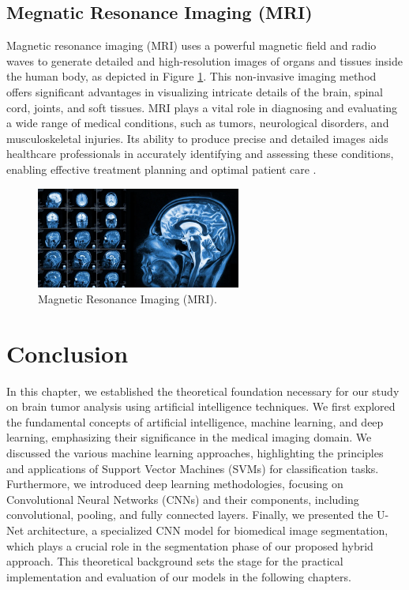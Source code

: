 \subsection{Megnatic Resonance Imaging (MRI)}
\label{sec:mri}
Magnetic resonance imaging (MRI) uses a powerful magnetic field and radio waves to
generate detailed and high-resolution images of organs and tissues inside the human body, as
depicted in Figure \ref{fig:mri}. This non-invasive imaging method offers significant advantages in
visualizing intricate details of the brain, spinal cord, joints, and soft tissues. MRI plays a vital
role in diagnosing and evaluating a wide range of medical conditions, such as tumors,
neurological disorders, and musculoskeletal injuries. Its ability to produce precise and detailed
images aids healthcare professionals in accurately identifying and assessing these conditions,
enabling effective treatment planning and optimal patient care \cite{verywell_mri}.

\begin{figure}[H]
  \centering
  \includegraphics[width=0.6\textwidth]{Images/Chapter1/mri.png}
  \caption{Magnetic Resonance Imaging (MRI).}
  \label{fig:mri}
\end{figure}

\section{Conclusion}
\label{sec:conclusion}

In this chapter, we established the theoretical foundation necessary for our study on brain tumor analysis using artificial intelligence techniques. We first explored the fundamental concepts of artificial intelligence, machine learning, and deep learning, emphasizing their significance in the medical imaging domain. We discussed the various machine learning approaches, highlighting the principles and applications of Support Vector Machines (SVMs) for classification tasks. Furthermore, we introduced deep learning methodologies, focusing on Convolutional Neural Networks (CNNs) and their components, including convolutional, pooling, and fully connected layers. Finally, we presented the U-Net architecture, a specialized CNN model for biomedical image segmentation, which plays a crucial role in the segmentation phase of our proposed hybrid approach. This theoretical background sets the stage for the practical implementation and evaluation of our models in the following chapters.
